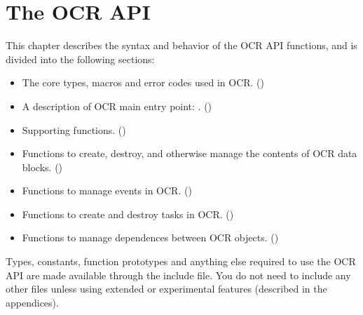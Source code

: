 %
\chapter{The OCR API }
\label{chap:OCRAPI}

This chapter describes the syntax and behavior of the OCR API functions, and is divided
into the following sections:
\begin{itemize}
\item The core types, macros and error codes used in OCR.
()

\item A description of OCR main entry point: .
()

\item Supporting functions.
()

\item Functions to create, destroy, and otherwise manage the contents of OCR data blocks.
()

\item Functions to manage events in OCR.
()

\item Functions to create and destroy tasks in OCR.
()

\item Functions to manage dependences between OCR objects.
()
\end{itemize}

Types, constants, function prototypes and anything else required to use the
OCR API are made available through the  include file. You do not
need to include any other files unless using extended or experimental
features (described in the appendices).
